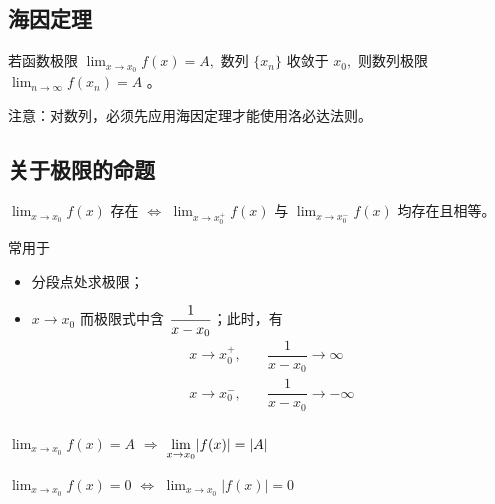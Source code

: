 \subsection{海因定理}

\begin{Theo}[海因定理]

    若函数极限 $ \displaystyle\lim_{x\rightarrow x_0}f(x)=A, $ 
    数列 $ \{x_n\} $ 收敛于 $ x_0, $ 
    则数列极限 $ \displaystyle\lim_{n\rightarrow\infty}f(x_n)=A $ 。
\end{Theo}

注意：对数列，必须先应用海因定理才能使用洛必达法则。

\subsection{关于极限的命题}

\begin{Field}[极限命题1]

    $ {\displaystyle\lim_{x\rightarrow x_0}}f(x) $ 存在 $ \Leftrightarrow $ $ {\displaystyle\lim_{x\rightarrow x_0^+}}f(x) $ 
    与 $ {\displaystyle\lim_{x\rightarrow x_0^-}}f(x) $ 均存在且相等。
\end{Field}

常用于

\begin{itemize}
    \item 分段点处求极限；
    \item $ x\rightarrow x_0 $ 而极限式中含 $\displaystyle \frac{1}{x-x_0} $；此时，有
    \begin{equation*}
        \begin{aligned}
            x\rightarrow x_0^+,&\quad{}\dfrac{1}{x-x_0}\rightarrow\infty\\
            x\rightarrow x_0^-,&\quad{}\dfrac{1}{x-x_0}\rightarrow-\infty\\    
        \end{aligned}
    \end{equation*}
\end{itemize}

\begin{Field}[极限命题2]

    $ {\displaystyle\lim_{x\rightarrow x_0}}f(x)=A $ $ \Rightarrow $ 
    $ {\displaystyle\displaystyle\lim_{x\rightarrow x_0}}|f(x)| = |A| $ 
\end{Field}

\begin{Field}[极限命题3]

    $ {\displaystyle\lim_{x\rightarrow x_0}}f(x)=0 $ $ \Leftrightarrow $ 
    $ {\displaystyle\lim_{x\rightarrow x_0}}|f(x)| = 0 $ 
\end{Field}

